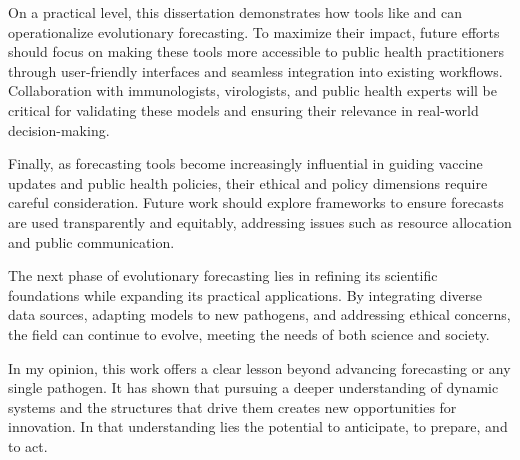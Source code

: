 On a practical level, this dissertation demonstrates how tools like \evofr and \forecastsNcov can operationalize evolutionary forecasting.
To maximize their impact, future efforts should focus on making these tools more accessible to public health practitioners through user-friendly interfaces and seamless integration into existing workflows.
Collaboration with immunologists, virologists, and public health experts will be critical for validating these models and ensuring their relevance in real-world decision-making.

Finally, as forecasting tools become increasingly influential in guiding vaccine updates and public health policies, their ethical and policy dimensions require careful consideration.
Future work should explore frameworks to ensure forecasts are used transparently and equitably, addressing issues such as resource allocation and public communication.

The next phase of evolutionary forecasting lies in refining its scientific foundations while expanding its practical applications. By integrating diverse data sources, adapting models to new pathogens, and addressing ethical concerns, the field can continue to evolve, meeting the needs of both science and society.



In my opinion, this work offers a clear lesson beyond advancing forecasting or any single pathogen.
It has shown that pursuing a deeper understanding of dynamic systems and the structures that drive them creates new opportunities for innovation.
In that understanding lies the potential to anticipate, to prepare, and to act.

